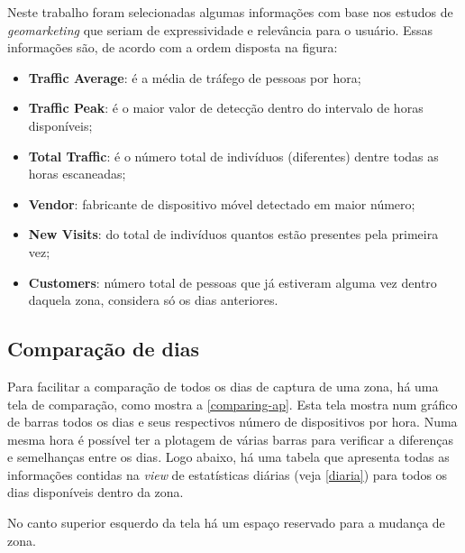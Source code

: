 Neste trabalho foram selecionadas algumas informações com base nos estudos de \emph{geomarketing} que seriam
de expressividade e relevância para o usuário. Essas informações são, de acordo com a ordem disposta
na figura:

\begin{itemize}
    \item \textbf{Traffic Average}: é a média de tráfego de pessoas por hora;
    \item \textbf{Traffic Peak}: é o maior valor de detecção dentro do intervalo de horas disponíveis;
    \item \textbf{Total Traffic}: é o número total de indivíduos (diferentes) dentre todas as horas escaneadas;
    \item \textbf{Vendor}: fabricante de dispositivo móvel detectado em maior número;
    \item \textbf{New Visits}: do total de indivíduos quantos estão presentes pela primeira vez;
    \item \textbf{Customers}: número total de pessoas que já estiveram alguma vez dentro daquela zona, considera
    só os dias anteriores.
\end{itemize}

\subsection{Comparação de dias}
Para facilitar a comparação de todos os dias de captura de uma zona, há uma tela de comparação, como mostra
a \autoref{comparing-ap}. Esta tela mostra num gráfico de barras todos os dias e seus respectivos número
de dispositivos por hora. Numa mesma hora é possível ter a plotagem de várias barras para verificar
a diferenças e semelhanças entre os dias. Logo abaixo, há uma tabela que apresenta todas as informações
contidas na \emph{view} de estatísticas diárias (veja \autoref{diaria}) para todos os dias disponíveis dentro
da zona.

No canto superior esquerdo da tela há um espaço reservado para a mudança de zona.

